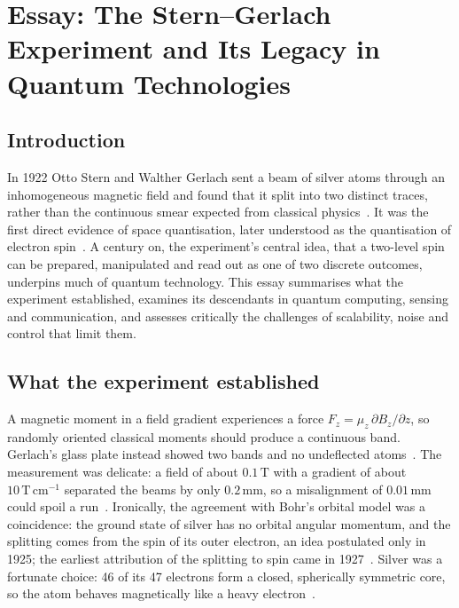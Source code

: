 \section{Essay: The Stern--Gerlach Experiment and Its Legacy in Quantum Technologies}

\subsection{Introduction}

In 1922 Otto Stern and Walther Gerlach sent a beam of silver atoms through an inhomogeneous magnetic field and found that it split into two distinct traces, rather than the continuous smear expected from classical physics~\cite{gerlach1922,bauer2023}. It was the first direct evidence of space quantisation, later understood as the quantisation of electron spin~\cite{friedrich2003,schmidt2016}. A century on, the experiment's central idea, that a two-level spin can be prepared, manipulated and read out as one of two discrete outcomes, underpins much of quantum technology. This essay summarises what the experiment established, examines its descendants in quantum computing, sensing and communication, and assesses critically the challenges of scalability, noise and control that limit them.

\subsection{What the experiment established}

A magnetic moment in a field gradient experiences a force $F_z=\mu_z\,\partial B_z/\partial z$, so randomly oriented classical moments should produce a continuous band. Gerlach's glass plate instead showed two bands and no undeflected atoms~\cite{bauer2023}. The measurement was delicate: a field of about $0.1\,\mathrm{T}$ with a gradient of about $10\,\mathrm{T\,cm^{-1}}$ separated the beams by only $0.2\,\mathrm{mm}$, so a misalignment of $0.01\,\mathrm{mm}$ could spoil a run~\cite{friedrich2003}. Ironically, the agreement with Bohr's orbital model was a coincidence: the ground state of silver has no orbital angular momentum, and the splitting comes from the spin of its outer electron, an idea postulated only in 1925; the earliest attribution of the splitting to spin came in 1927~\cite{friedrich2003}. Silver was a fortunate choice: 46 of its 47 electrons form a closed, spherically symmetric core, so the atom behaves magnetically like a heavy electron~\cite{lecture6}.

